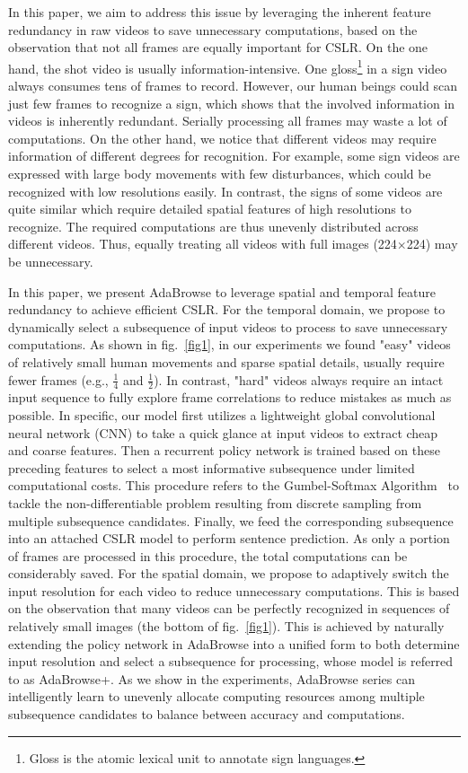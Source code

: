 \documentclass[sigconf]{acmart}
\begin{document}
In this paper, we aim to address this issue by leveraging the inherent feature redundancy in raw videos to save unnecessary computations, based on the observation that not all frames are equally important for CSLR. On the one hand, the shot video is usually information-intensive. One gloss\footnote{Gloss is the atomic lexical unit to annotate sign languages.} in a sign video always consumes tens of frames to record. However, our human beings could scan just few frames to recognize a sign, which shows that the involved information in videos is inherently redundant. Serially processing all frames may waste a lot of computations. On the other hand, we notice that different videos may require information of different degrees for recognition. For example, some sign videos are expressed with large body movements with few disturbances, which could be recognized with low resolutions easily. In contrast, the signs of some videos are quite similar which require detailed spatial features of high resolutions to recognize. The required computations are thus unevenly distributed across different videos. Thus, equally treating all videos with full images (224$\times$224) may be unnecessary.


In this paper, we present AdaBrowse to leverage spatial and temporal feature redundancy to achieve efficient CSLR. For the temporal domain, we propose to dynamically select a subsequence of input videos to process to save unnecessary computations. As shown in fig.~\ref{fig1}, in our experiments we found "easy" videos of relatively small human movements and sparse spatial details, usually require fewer frames (e.g., $\frac{1}{4}$ and $\frac{1}{2}$). In contrast, "hard" videos always require an intact input sequence to fully explore frame correlations to reduce mistakes as much as possible. In specific, our model first utilizes a lightweight global convolutional neural network (CNN) to take a quick glance at input videos to extract cheap and coarse features. Then a recurrent policy network is trained based on these preceding features to select a most informative subsequence under limited computational costs. This procedure refers to the Gumbel-Softmax Algorithm~\cite{jang2016categorical} to tackle the non-differentiable problem resulting from discrete sampling from multiple subsequence candidates. Finally, we feed the corresponding subsequence into an attached CSLR model to perform sentence prediction. As only a portion of frames are processed in this procedure, the total computations can be considerably saved. For the spatial domain, we propose to adaptively switch the input resolution for each video to reduce unnecessary computations. This is based on the observation that many videos can be perfectly recognized in sequences of relatively small images (the bottom of fig.~\ref{fig1}). This is achieved by naturally extending the policy network in AdaBrowse into a unified form to both determine input resolution and select a subsequence for processing, whose model is referred to as AdaBrowse+. As we show in the experiments, AdaBrowse series can intelligently learn to unevenly allocate computing resources among multiple subsequence candidates to balance between accuracy and computations.
  
\end{document}

